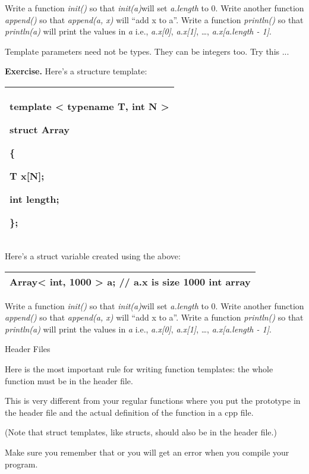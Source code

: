 \documentclass[
]{article}
\begin{document}
Write a function \emph{init()} so that \emph{init(a)}will set
\emph{a.length} to 0. Write another function \emph{append()} so that
\emph{append(a, x)} will ``add x to a''. Write a function
\emph{println()} so that \emph{println(a)} will print the values in
\emph{a} i.e., \emph{a.x{[}0{]}}, \emph{a.x{[}1{]}}, \ldots,
\emph{a.x{[}a.length - 1{]}}.

Template parameters need not be types. They can be integers too. Try
this ...

\textbf{Exercise.} Here's a structure template:

\begin{longtable}[]{@{}l@{}}
\toprule
\endhead
\begin{minipage}[t]{0.97\columnwidth}\raggedright
template \textless{} typename T, int N \textgreater{}

struct Array

\{

T x{[}N{]};

int length;

\};\strut
\end{minipage}\tabularnewline
\bottomrule
\end{longtable}

Here's a struct variable created using the above:

\begin{longtable}[]{@{}l@{}}
\toprule
\endhead
Array\textless{} int, 1000 \textgreater{} a; // a.x is size 1000 int
array \tabularnewline
\bottomrule
\end{longtable}

Write a function \emph{init()} so that \emph{init(a)}will set
\emph{a.length} to 0. Write another function \emph{append()} so that
\emph{append(a, x)} will ``add x to a''. Write a function
\emph{println()} so that \emph{println(a)} will print the values in
\emph{a} i.e., \emph{a.x{[}0{]}}, \emph{a.x{[}1{]}}, \ldots,
\emph{a.x{[}a.length - 1{]}}.

Header Files

Here is the most important rule for writing function templates: the
whole function must be in the header file.

This is very different from your regular functions where you put the
prototype in the header file and the actual definition of the function
in a cpp file.

(Note that struct templates, like structs, should also be in the header
file.)

Make sure you remember that or you will get an error when you compile
your program.
\end{document}
